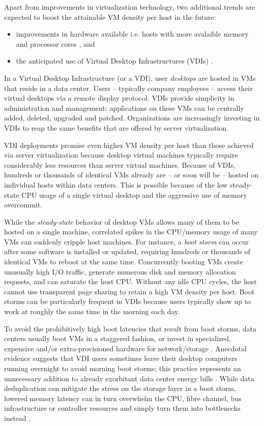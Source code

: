Apart from improvements in virtualization technology, two additional trends 
are expected to boost the attainable VM density per host in the future:
\begin{itemize}
\item improvements in hardware available i.e. hosts with
more avalaible memory and processor cores \cite{hansen2010lithium},
and 
\item the anticipated use of Virtual Desktop Infrastructures (VDIs) \cite{vmwarevdi}.
\end{itemize}

In a Virtual Desktop Infrastructure (or a VDI), user {\em desktops} are hosted in
VMs that reside in a data center. 
Users -- typically company employees -- access their virtual desktops via a remote display protocol. 
VDIs provide simplicity in administration and management: applications on 
these VMs can be centrally added, deleted, upgraded and patched. 
Organizations are increasingly investing in VDIs to reap the same benefits
that are offered by server virtualization.

VDI deployments promise even higher VM density per
host than those achieved via server virtualization
because desktop virtual machines typically require
considerably less resources than server virtual machines.
Because of VDIs, hundreds or thousands of identical VMs already are -- or soon
will be -- hosted on individual hosts within data centers.
This is possible because of the low steady-state CPU
usage of a single virtual desktop and the aggressive
use of memory overcommit.

While the {\em steady-state} behavior of desktop VMs
allows many of them to be hosted on a single machine,
correlated spikes in the CPU/memory usage of many VMs can suddenly 
cripple host machines. For instance, a \emph{boot storm} \cite{hansen2010lithium, 
liao2011vmstore, meng2010tide, rajan2010vdc, vaghani2010virtual}
can occur after some software is installed or updated, requiring hundreds 
or thousands of identical VMs to reboot at the same time.
Concurrently booting VMs create unusually high I/O traffic,
generate numerous disk and memory allocation requests,
and can saturate the host CPU. Without any idle
CPU cycles, the host cannot use transparent page sharing
to retain a high VM density per host. Boot storms can be
particularly frequent in VDIs because users typically show up to
work at roughly the same time in the morning each day. 

To avoid the prohibitively high boot latencies that  
result from boot storms, data centers usually
boot VMs in a staggered fashion, or invest in specialized,
expensive and/or extra-provisioned hardware for network/storage \cite{highperfnas, liao2011vmstore}.
Anecdotal evidence suggests that VDI users sometimes leave their desktop computers running
overnight to avoid morning boot storms; this practice
represents an unnecessary addition to already exorbitant
data center energy bills \cite{qureshi2009bills}. 
While data deduplication \cite{clements2009deduplication}
can mitigate the stress on the storage layer in
a boot storm, lowered memory latency can in turn overwhelm the CPU, 
fibre channel, bus infrastructure or controller resources 
and simply turn them into bottlenecks instead \cite{netappstorm}. 


